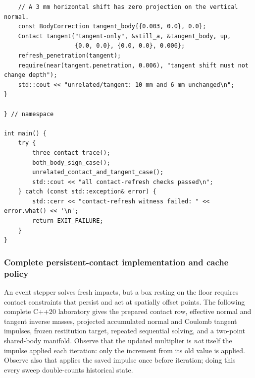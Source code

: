 \begin{verbatim}
    // A 3 mm horizontal shift has zero projection on the vertical normal.
    const BodyCorrection tangent_body{{0.003, 0.0}, 0.0};
    Contact tangent{"tangent-only", &still_a, &tangent_body, up,
                    {0.0, 0.0}, {0.0, 0.0}, 0.006};
    refresh_penetration(tangent);
    require(near(tangent.penetration, 0.006), "tangent shift must not change depth");
    std::cout << "unrelated/tangent: 10 mm and 6 mm unchanged\n";
}

} // namespace

int main() {
    try {
        three_contact_trace();
        both_body_sign_case();
        unrelated_contact_and_tangent_case();
        std::cout << "all contact-refresh checks passed\n";
    } catch (const std::exception& error) {
        std::cerr << "contact-refresh witness failed: " << error.what() << '\n';
        return EXIT_FAILURE;
    }
}
\end{verbatim}

\subsubsection{Complete persistent-contact implementation and cache policy}\label{06-engine-ii-ch046-complete-persistent-contact-implementation-and-cache-policy}

\hypertarget{06-engine-ii-ch046-complete-persistent-contact-implementation-and-cache-policy}{}

An event stepper solves fresh impacts, but a box resting on the floor requires contact constraints that persist and act at spatially offset points. The following complete C++20 laboratory gives the prepared contact row, effective normal and tangent inverse masses, projected accumulated normal and Coulomb tangent impulses, frozen restitution target, repeated sequential solving, and a two-point shared-body manifold. Observe that the updated multiplier is \emph{not} itself the impulse applied each iteration: only the increment from its old value is applied. Observe also that  applies the saved impulse once before iteration; doing this every sweep double-counts historical state.

